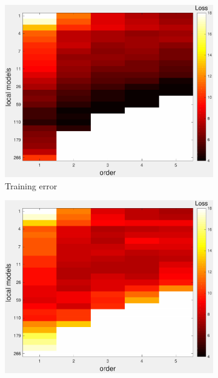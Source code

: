 \documentclass[letterpaper, 10 pt, conference]{ieeeconf}  %
\begin{document}
 \begin{figure}[thpb]
        \centering
        \begin{subfigure}[b]{1in} 
                \centering
                \includegraphics[width=\textwidth]{figures/cross_allreg1.pdf}
                \caption{Training error}
                \label{fig:crossval_train}
        \end{subfigure}
                \begin{subfigure}[b]{1in} 
                \centering
                \includegraphics[width=\textwidth]{figures/cross_allreg2.pdf}

\end{subfigure}
\end{figure}
\end{document}
